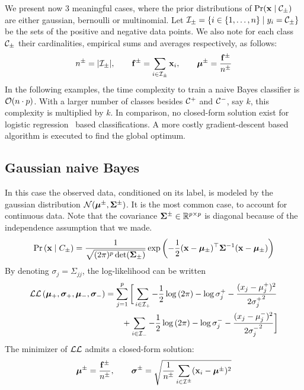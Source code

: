 We present now 3 meaningful cases, where the prior distributions of $\Pr(\mathbf{x} \mid \mathcal{C}_\pm)$ are either
gaussian, bernoulli or multinomial.
Let $\mathcal{I}_\pm = \left\{ i \in \left\{ 1, \dots, n \right\} \mid y_i = \mathcal{C}_\pm \right\}$ be the sets of the positive and negative data points.
We also note for each class $\mathcal{C}_\pm$ their cardinalities, empirical sums and averages respectively, as follows:
\begin{equation*}
        n^\pm = | \mathcal{I}_\pm |,
        \qquad
        \mathbf{f}^\pm = \sum_{i \in \mathcal{I}_\pm} \mathbf{x}_i,
        \qquad
        \bm{\mu}^\pm = \frac{\mathbf{f}^\pm}{n^\pm}
\end{equation*}
In the following examples, the time complexity to train a naive Bayes classifier is $\mathcal{O}(n \cdot p)$.
With a larger number of classes besides $\mathcal{C}^+$ and $\mathcal{C}^-$, say $k$, this complexity is multiplied by $k$.
In comparison, no closed-form solution exist for logistic regression~\cite{logistic_regression} based classifications.
A more costly gradient-descent based algorithm is executed to find the global optimum.

\subsection{Gaussian naive Bayes}\label{subsec:gnb}

In this case the observed data, conditioned on its label, is modeled by the gaussian distribution
$\mathcal{N}( \bm{\mu}^\pm, \bm{\Sigma}^\pm )$.
It is the most common case, to account for continuous data.
Note that the covariance $\bm{\Sigma}^\pm \in \mathbb{R}^{p \times p}$ is diagonal because of the independence assumption that we made.
\[
        \Pr\left( \mathbf{x} \mid C_\pm \right) =
        \frac{1}{\sqrt{(2\pi)^p\det(\bm{\Sigma}_\pm)}}
        \exp\left( -\frac{1}{2}(\mathbf{x} - \bm{\mu}_\pm)^\top\bm{\Sigma}^{-1}(\mathbf{x} - \bm{\mu}_\pm) \right)
\]
By denoting $\sigma_j = \Sigma_{j j}$, the log-likelihood can be written
\begin{equation*}
        \begin{split}
                \mathcal{L}\mathcal{L}\left( \bm{\mu}_+, \bm{\sigma}_+, \bm{\mu}_-, \bm{\sigma}_-\right ) &=
                        \sum_{j = 1}^p \bigg[
                                \sum_{i \in \mathcal{I}_+}
                                        -\frac{1}{2} \log \left( 2\pi \right)
                                        -\log \sigma_j^+
                                        -\frac{(x_j - \mu^+_j)^2}{2{\sigma^+_j}^2}\\
                                &\qquad+ \sum_{i \in \mathcal{I}_-}
                                        -\frac{1}{2} \log \left( 2\pi \right)
                                        -\log \sigma_j^-
                                        -\frac{(x_j - \mu^-_j)^2}{2{\sigma^-_j}^2}
                        \bigg]
        \end{split}
\end{equation*}
The minimizer of $\mathcal{L}\mathcal{L}$ admits a closed-form solution:
\begin{align*}
        \bm{\mu}^\pm = \frac{\mathbf{f}^\pm}{n^\pm}
        ,\qquad
        \bm{\sigma}^\pm = \sqrt{\frac{1}{n^\pm} \sum_{i \in \mathcal{I}^\pm} (\mathbf{x}_i - \bm{\mu}^\pm)^2}
\end{align*}

